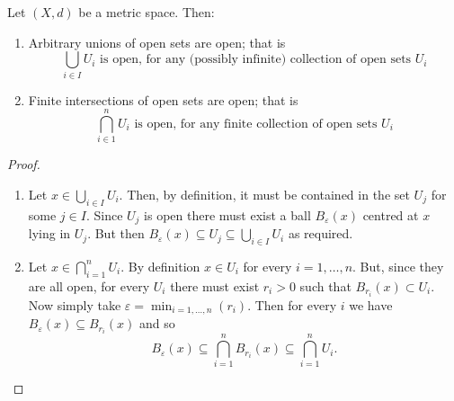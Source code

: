 \documentclass[10pt, a4paper]{article}
\begin{document}
\begin{lemma}
    Let $(X, d)$ be a metric space.
    Then:
    \begin{enumerate}[label = \arabic*.]
        \item Arbitrary unions of open sets are open;
        that is
        \[
        \bigcup_{i \in I}U_i\text{ is open, for any (possibly infinite) collection of open sets $U_i$}
        \]
        
        \item Finite intersections of open sets are open;
        that is
        \[
        \bigcap_{i \in 1}^{n}U_i\text{ is open, for any finite collection of open sets $U_i$}
        \]
    \end{enumerate}

    \begin{proof}
        \begin{enumerate}[label = \arabic*.]
        \item Let $x \in \bigcup_{i \in I}U_i$.
        Then,
        by definition,
        it must be contained in the set $U_j$ for some $j \in I$.
        Since $U_j$ is open there must exist a ball $B_{\varepsilon}(x)$ centred at $x$ lying in $U_j$.
        But then $B_{\varepsilon}(x) \subseteq U_j \subseteq \bigcup_{i \in I}U_i$ as required.

        \item Let $x \in \bigcap_{i = 1}^{n}U_i$.
        By definition $x \in U_i$ for every $i = 1, \dotsc, n$.
        But,
        since they are all open,
        for every $U_i$ there must exist $r_i > 0$ such that $B_{r_i}(x) \subset U_i$.
        Now simply take $\displaystyle\varepsilon = \min_{i = 1, \dotsc, n}(r_i)$.
        Then for every $i$ we have $B_{\varepsilon}(x) \subseteq B_{r_i}(x)$ and so
        \[
        B_{\varepsilon}(x) \subseteq \bigcap_{i = 1}^{n}B_{r_i}(x) \subseteq \bigcap_{i = 1}^{n}U_i.
        \]
        \end{enumerate}
    \end{proof}
    
\end{lemma}
\end{document}
